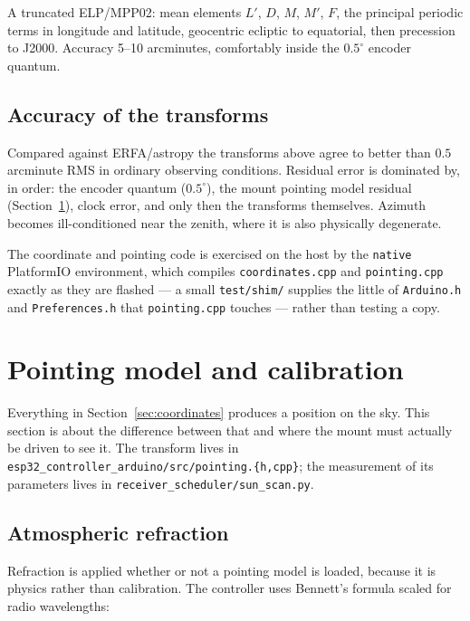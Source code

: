 \documentclass[11pt,a4paper]{article}
\begin{document}
A truncated ELP/MPP02: mean elements $L'$, $D$, $M$, $M'$, $F$, the principal periodic terms in longitude and latitude, geocentric ecliptic to equatorial, then precession to J2000. Accuracy 5--10 arcminutes, comfortably inside the $0.5^\circ$ encoder quantum.

\subsection{Accuracy of the transforms}

Compared against ERFA/astropy the transforms above agree to better than $0.5$ arcminute RMS in ordinary observing conditions. Residual error is dominated by, in order: the encoder quantum ($0.5^\circ$), the mount pointing model residual (Section~\ref{sec:pointing}), clock error, and only then the transforms themselves. Azimuth becomes ill-conditioned near the zenith, where it is also physically degenerate.

The coordinate and pointing code is exercised on the host by the \texttt{native} PlatformIO environment, which compiles \texttt{coordinates.cpp} and \texttt{pointing.cpp} exactly as they are flashed --- a small \texttt{test/shim/} supplies the little of \texttt{Arduino.h} and \texttt{Preferences.h} that \texttt{pointing.cpp} touches --- rather than testing a copy.

\section{Pointing model and calibration}
\label{sec:pointing}

Everything in Section~\ref{sec:coordinates} produces a position on the sky. This section is about the difference between that and where the mount must actually be driven to see it. The transform lives in \texttt{esp32\_controller\_arduino/src/pointing.\{h,cpp\}}; the measurement of its parameters lives in \texttt{receiver\_scheduler/sun\_scan.py}.

\subsection{Atmospheric refraction}

Refraction is applied whether or not a pointing model is loaded, because it is physics rather than calibration. The controller uses Bennett's formula \cite{bennett} scaled for radio wavelengths:
\end{document}
